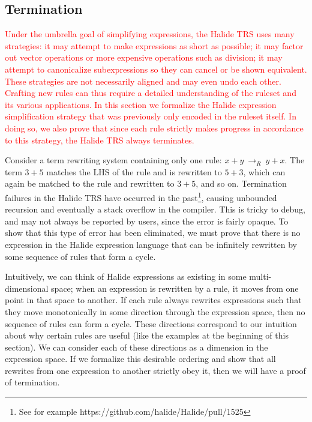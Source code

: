 \documentclass[acmsmall,review]{acmart}\settopmatter{printfolios=true,printccs=false,printacmref=false}
\newcommand{\modified}[1]{\textcolor{red}{{#1}}}
\newcommand{\rewrites}[0]{\:\rightarrow_{R}\:}
\begin{document}
\subsection{Termination}
\label{sec:termination}

\modified{Under the umbrella goal of simplifying expressions, the Halide TRS uses
many strategies: it may attempt to make expressions as short as possible; it may factor out
vector operations or more expensive operations such as division; it may attempt to
canonicalize subexpressions so they can cancel or be shown equivalent. These
strategies are not necessarily aligned and may even undo each other. Crafting new rules 
can thus require a detailed understanding of the ruleset and its various applications. 
In this section we formalize the Halide expression simplification strategy that was
previously only encoded in the ruleset itself. In doing so, we also prove that since 
each rule strictly makes progress in accordance to this strategy, the Halide TRS always terminates.}

Consider a term
rewriting system containing only one rule: $x + y \rewrites y + x$. The term
$3 + 5$ matches the LHS of the rule and is rewritten to $5 + 3$, which can again
be matched to the rule and rewritten to $3 + 5$, and so on. Termination failures in the Halide TRS have occurred in the past\footnote{See for example https://github.com/halide/Halide/pull/1525}, causing unbounded recursion and eventually a stack overflow in the compiler. This is tricky to debug, and may not always be reported by users, since the error is fairly opaque. To show that this type of error has been eliminated, we must prove that there is no expression in the Halide expression language that can be infinitely rewritten by some sequence of rules that form a cycle.

Intuitively, we can think of Halide expressions as existing in some multi-dimensional space; when an expression is rewritten by a rule, it moves from one point in that space to another. If each rule always rewrites expressions such that they move monotonically in some direction through the expression space, then no sequence of rules can form a cycle. These directions correspond to our intuition about why certain rules are useful (like the examples at the beginning of this section). We can consider each of these directions as a dimension in the expression space. If we formalize this desirable ordering and show that all rewrites from one expression to another strictly obey it, then we will have a proof of termination.
\end{document}
